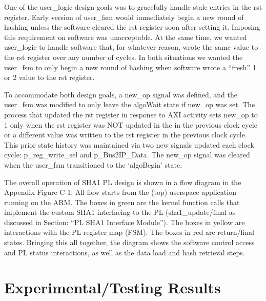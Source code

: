 \documentclass[journal]{IEEEtran}
\begin{document}
One of the user\_logic design goals was to gracefully handle stale entries in the rst register.  Early version of user\_fsm would immediately begin a new round of hashing unless the software cleared the rst register soon after setting it.  Imposing this requirement on software was unacceptable.  At the same time, we wanted user\_logic to handle software that, for whatever reason, wrote the same value to the rst register over any number of cycles.  In both situations we wanted the user\_fsm to only begin a new round of hashing when software wrote a “fresh” 1 or 2 value to the rst register.

To accommodate both design goals, a new\_op signal was defined, and the user\_fsm was modified to only leave the algoWait state if new\_op was set.  The process that updated the rst register in response to AXI activity sets new\_op to 1 only when the rst register was NOT updated in the in the previous clock cycle or a different value was written to the rst register in the previous clock cycle.  This prior state history was maintained via two new signals updated each clock cycle: p\_reg\_write\_sel and p\_Bus2IP\_Data.  The new\_op signal was cleared when the user\_fsm transitioned to the ‘algoBegin’ state.

The overall operation of SHA1 PL design is shown in a flow diagram in the Appendix Figure C-1. All flow starts from the (top) userspace application running on the ARM.  The boxes in green are the kernel function calls that implement the custom SHA1 interfacing to the PL (sha1\_update/final as discussed in Section: “PL SHA1 Interface Module”).  The boxes in yellow are interactions with the PL register map (FSM).  The boxes in red are return/final states.  Bringing this all together, the diagram shows the software control access and PL status interactions, as well as the data load and hash retrieval steps.

\section{Experimental/Testing Results}
\end{document}
